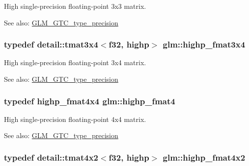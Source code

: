 High single-precision floating-point 3x3 matrix. \begin{Desc}
\item[See also:]\hyperlink{group__gtc__type__precision}{GLM\_\-GTC\_\-type\_\-precision} \end{Desc}
\hypertarget{group__gtc__type__precision_g1f377a3da21dd6c418ec3a5119a4514a}{
\subsubsection[highp\_\-fmat3x4]{\setlength{\rightskip}{0pt plus 5cm}typedef detail::tmat3x4$<$f32, highp$>$ {\bf glm::highp\_\-fmat3x4}}}
\label{group__gtc__type__precision_g1f377a3da21dd6c418ec3a5119a4514a}


High single-precision floating-point 3x4 matrix. \begin{Desc}
\item[See also:]\hyperlink{group__gtc__type__precision}{GLM\_\-GTC\_\-type\_\-precision} \end{Desc}
\hypertarget{group__gtc__type__precision_g4c7c9823ade7c29e29b5a313949ae502}{
\subsubsection[highp\_\-fmat4]{\setlength{\rightskip}{0pt plus 5cm}typedef highp\_\-fmat4x4 {\bf glm::highp\_\-fmat4}}}
\label{group__gtc__type__precision_g4c7c9823ade7c29e29b5a313949ae502}


High single-precision floating-point 4x4 matrix. \begin{Desc}
\item[See also:]\hyperlink{group__gtc__type__precision}{GLM\_\-GTC\_\-type\_\-precision} \end{Desc}
\hypertarget{group__gtc__type__precision_gb3d688f05a884be93c647bce2d8a46f4}{
\subsubsection[highp\_\-fmat4x2]{\setlength{\rightskip}{0pt plus 5cm}typedef detail::tmat4x2$<$f32, highp$>$ {\bf glm::highp\_\-fmat4x2}}}
\label{group__gtc__type__precision_gb3d688f05a884be93c647bce2d8a46f4}


